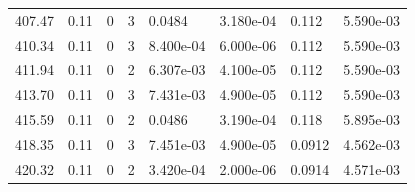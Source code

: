 \documentclass[preview]{standalone}
\begin{document}
{{{{{{{\begin{tabular}{L{1.2cm}C{1.2cm} C{0.3cm}C{0.5cm} C{1.4cm}C{1.4cm} C{1.4cm}C{1.4cm}}
  407.47  &  0.11  & 0     &  3 &  0.0484  & 3.180e-04  & 0.112 &  5.590e-03   \\ 
  410.34  &  0.11  & 0     &  3 &  8.400e-04  & 6.000e-06  & 0.112 &  5.590e-03   \\ 
  411.94  &  0.11  & 0     &  2 &  6.307e-03  & 4.100e-05  & 0.112 &  5.590e-03   \\ 
  413.70  &  0.11  & 0     &  3 &  7.431e-03  & 4.900e-05  & 0.112 &  5.590e-03   \\ 
  415.59  &  0.11  & 0     &  2 &  0.0486  & 3.190e-04  & 0.118 &  5.895e-03   \\ 
  418.35  &  0.11  & 0     &  3 &  7.451e-03  & 4.900e-05  & 0.0912 &  4.562e-03   \\ 
  420.32  &  0.11  & 0     &  2 &  3.420e-04  & 2.000e-06  & 0.0914 &  4.571e-03   \\ 
\hline 
\end{tabular} 

}}}}}}}
\end{document}
